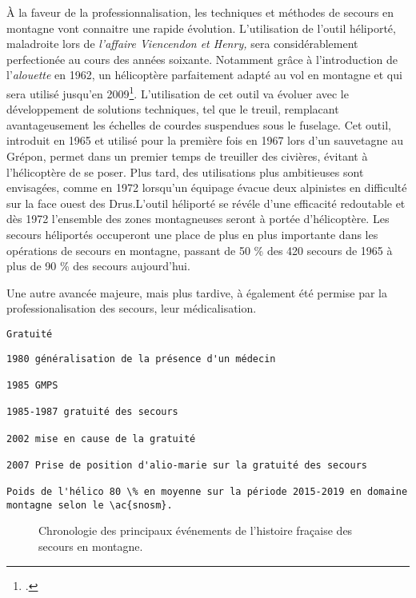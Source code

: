 À la faveur de la professionnalisation, les techniques et méthodes de
secours en montagne vont connaitre une rapide évolution. L'utilisation
de l'outil héliporté, maladroite lors de \emph{l'affaire Viencendon et
  Henry,} sera considérablement perfectionée au cours des années
soixante. Notamment grâce à l'introduction de l'\emph{alouette
  } en 1962, un hélicoptère parfaitement adapté au vol en
montagne et qui sera utilisé jusqu'en 2009\footcite{Elie2006,
  Lafond, Lafond2011b}. L'utilisation de cet outil va évoluer avec le
développement de solutions techniques, tel que le treuil, remplacant
avantageusement les échelles de courdes suspendues sous le
fuselage. Cet outil, introduit en 1965 et utilisé pour la première
fois en 1967 lors d'un sauvetagne au Grépon,
permet dans un premier temps de treuiller des civières, évitant à
l'hélicoptère de se poser. Plus tard, des utilisations plus
ambitieuses sont envisagées, comme en 1972 lorsqu'un équipage évacue
deux alpinistes en difficulté sur la face ouest des
Drus.L'outil héliporté se révéle d'une
efficacité redoutable et dès 1972 l'ensemble des zones montagneuses
seront à portée d'hélicoptère. Les secours
héliportés occuperont une place de plus en plus importante dans les
opérations de secours en montagne, passant de 50 \% des 420 secours de
1965 à plus de 90 \% des secours aujourd'hui.

Une autre avancée majeure, mais plus tardive, à également été permise
par la professionalisation des secours, leur médicalisation.


\texttt{Gratuité}

\begin{verbatim}
1980 généralisation de la présence d'un médecin

1985 GMPS

1985-1987 gratuité des secours

2002 mise en cause de la gratuité

2007 Prise de position d'alio-marie sur la gratuité des secours

Poids de l'hélico 80 \% en moyenne sur la période 2015-2019 en domaine
montagne selon le \ac{snosm}.
\end{verbatim}

\begin{figure}
  \centering
   
   \caption{Chronologie des principaux événements de
     l'histoire fraçaise des secours en montagne.}
  \label{fig:frise_chronologique}
\end{figure}


